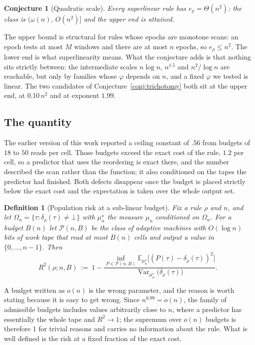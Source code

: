 \documentclass[11pt]{article}
\newtheorem{conjecture}{Conjecture}
\newtheorem{definition}{Definition}
\begin{document}
\begin{conjecture}[Quadratic scale]\label{conj:quadratic}
Every superlinear rule has $e_\rho=\Theta(n^2)$: the class is $(\omega(n),\,O(n^2)]$ and the
upper end is attained.
\end{conjecture}

The upper bound is structural for rules whose epochs are monotone scans: an epoch tests at
most $M$ windows and there are at most $n$ epochs, so $e_\rho\le n^2$. The lower end is what
superlinearity means. What the conjecture adds is that nothing sits strictly between: the
intermediate scales $n\log n$, $n^{1.5}$ and $n^2/\log n$ are reachable, but only by families
whose $\varphi$ depends on $n$, and a fixed $\varphi$ we tested is linear. The two candidates
of Conjecture~\ref{conj:trichotomy} both sit at the upper end, at $0.10\,n^2$ and at exponent
$1.99$.

\subsection{The quantity}

The earlier version of this work reported a ceiling constant of $.56$ from budgets of $18$
to $50$ reads per cell. Those budgets exceed the exact cost of the rule, $1.2$ per cell, so a
predictor that uses the reordering is exact there, and the number described the scan rather
than the function; it also conditioned on the tapes the predictor had finished. Both defects
disappear once the budget is placed strictly below the exact cost and the expectation is
taken over the whole output set.

\begin{definition}[Population risk at a sub-linear budget]\label{def:r2}
Fix a rule $\rho$ and $n$, and let $\Omega_n=\{\tau:\delta_\rho(\tau)\neq\bot\}$ with
$\mu_n^\star$ the measure $\mu_n$ conditioned on $\Omega_n$. For a budget $B(n)$ let
$\mathcal P(n,B)$ be the class of adaptive machines with $O(\log n)$ bits of work tape that
read at most $B(n)$ cells and output a value in $\{0,\dots,n-1\}$. Then
\[
R^2(\rho;n,B)\ :=\ 1-\frac{\inf_{P\in\mathcal P(n,B)}\mathbb E_{\mu_n^\star}\big[(P(\tau)-\delta_\rho(\tau))^2\big]}
{\operatorname{Var}_{\mu_n^\star}\big(\delta_\rho(\tau)\big)} .
\]
\end{definition}

A budget written as $o(n)$ is the wrong parameter, and the reason is worth stating because
it is easy to get wrong. Since $n^{0.99}=o(n)$, the family of admissible budgets includes
values arbitrarily close to $n$, where a predictor has essentially the whole tape and
$R^2\to1$; the supremum over $o(n)$ budgets is therefore $1$ for trivial reasons and carries
no information about the rule. What is well defined is the risk at a fixed fraction of the
exact cost.
\end{document}
